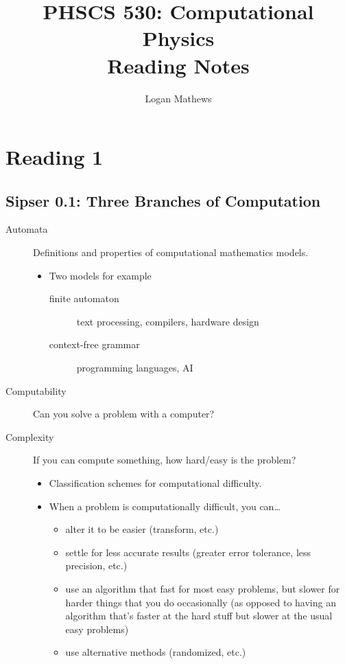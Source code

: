 \documentclass{article}
\title{PHSCS 530: Computational Physics\\\large Reading Notes}
\author{Logan Mathews}
\begin{document}
\maketitle
\pagebreak
\tableofcontents
\pagebreak
\section{Reading 1}
\subsection{Sipser 0.1: Three Branches of Computation}
\begin{description}
    \item [Automata] Definitions and properties of computational mathematics models.
    \begin{itemize}
        \item Two models for example
        \begin{description}
            \item [finite automaton] text processing, compilers, hardware design
            \item [context-free grammar] programming languages, AI
        \end{description}
    \end{itemize}
    \item [Computability] Can you solve a problem with a computer?
    \item [Complexity] If you can compute something, how hard/easy is the problem?
    \begin{itemize}
        \item Classification schemes for computational difficulty.
        \item When a problem is computationally difficult, you can\dots
        \begin{itemize}
            \item alter it to be easier (transform, etc.)
            \item settle for less accurate results (greater error tolerance, less precision, etc.)
            \item use an algorithm that fast for most easy problems, but slower for harder things that you do occasionally (as opposed to having an algorithm that's faster at the hard stuff but slower at the usual easy problems)
            \item use alternative methods (randomized, etc.)
        \end{itemize}
    \end{itemize}
\end{description}
\end{document}
